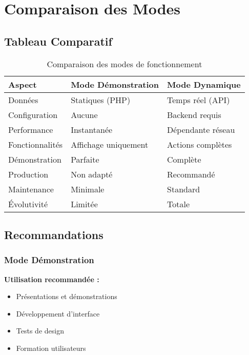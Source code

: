 \documentclass[12pt,a4paper]{report}
\begin{document}
\chapter{Comparaison des Modes}

\section{Tableau Comparatif}

\begin{table}[H]
\centering
\begin{tabular}{@{}p{3cm}p{6cm}p{6cm}@{}}
\toprule
\textbf{Aspect} & \textbf{Mode Démonstration} & \textbf{Mode Dynamique} \\ \midrule
Données & Statiques (PHP) & Temps réel (API) \\
Configuration & Aucune & Backend requis \\
Performance & Instantanée & Dépendante réseau \\
Fonctionnalités & Affichage uniquement & Actions complètes \\
Démonstration & Parfaite & Complète \\
Production & Non adapté & Recommandé \\
Maintenance & Minimale & Standard \\
Évolutivité & Limitée & Totale \\ \bottomrule
\end{tabular}
\caption{Comparaison des modes de fonctionnement}
\end{table}

\section{Recommandations}

\subsection{Mode Démonstration}

\textbf{Utilisation recommandée :}
\begin{itemize}
    \item Présentations et démonstrations
    \item Développement d'interface
    \item Tests de design
    \item Formation utilisateurs
\end{itemize}
\end{document}
